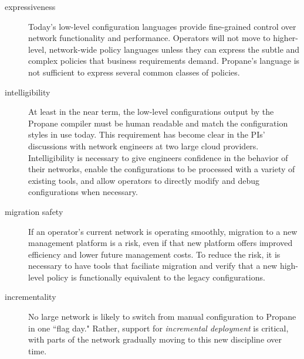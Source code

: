 \begin{description}
\item[expressiveness]  Today's low-level configuration languages provide fine-grained control over network functionality and performance.  Operators will not move to higher-level, network-wide policy languages unless they can express the subtle and complex policies that business requirements demand.  Propane's 
language is not sufficient to express several common classes of policies.

\item[intelligibility] At least in the near term, the low-level configurations output by the Propane compiler must be human readable and match the configuration styles in use today.  This requirement has become clear in the PIs' discussions with network engineers at two large cloud providers.  Intelligibility is necessary to give engineers confidence in the behavior of their networks, enable the configurations to be processed with a variety of existing tools, and allow operators to directly modify and debug configurations when necessary.  

\item[migration safety]  If an operator's current network is operating smoothly,
migration to a new management platform is a risk, even if that new platform
offers improved efficiency and lower future management costs.  To reduce the
risk, it is necessary to have tools that faciliate migration and verify that a new high-level policy is
functionally equivalent to the legacy configurations.

\item[incrementality] No large network is likely to switch from manual configuration to Propane in one ``flag day."   Rather, support for {\em incremental deployment} is critical, with parts of the network gradually moving to this new discipline over time.

\end{description}

